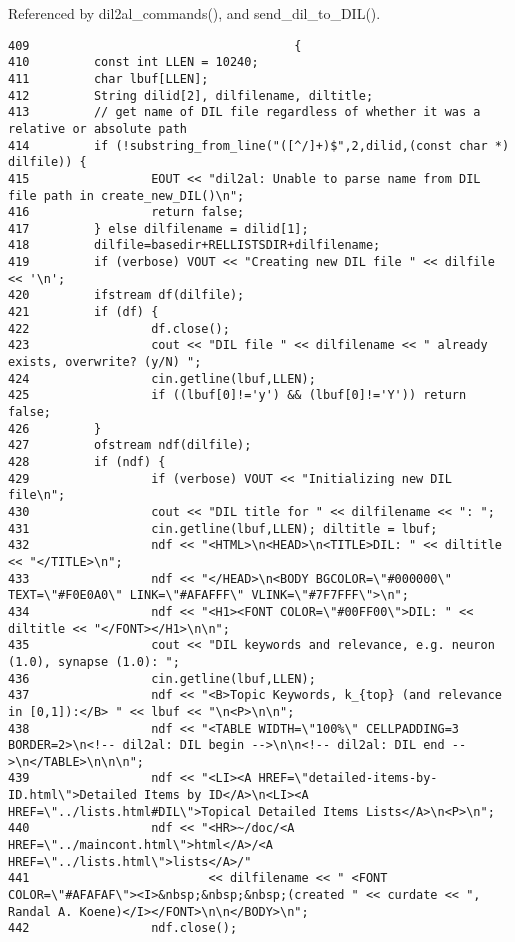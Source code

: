 Referenced by dil2al\_\-commands(), and send\_\-dil\_\-to\_\-DIL().



\footnotesize\begin{verbatim}409                                     {
410         const int LLEN = 10240;
411         char lbuf[LLEN];
412         String dilid[2], dilfilename, diltitle;
413         // get name of DIL file regardless of whether it was a relative or absolute path
414         if (!substring_from_line("([^/]+)$",2,dilid,(const char *) dilfile)) {
415                 EOUT << "dil2al: Unable to parse name from DIL file path in create_new_DIL()\n";
416                 return false;
417         } else dilfilename = dilid[1];
418         dilfile=basedir+RELLISTSDIR+dilfilename;
419         if (verbose) VOUT << "Creating new DIL file " << dilfile << '\n';
420         ifstream df(dilfile);
421         if (df) {
422                 df.close();
423                 cout << "DIL file " << dilfilename << " already exists, overwrite? (y/N) ";
424                 cin.getline(lbuf,LLEN);
425                 if ((lbuf[0]!='y') && (lbuf[0]!='Y')) return false;
426         }
427         ofstream ndf(dilfile);
428         if (ndf) {
429                 if (verbose) VOUT << "Initializing new DIL file\n";
430                 cout << "DIL title for " << dilfilename << ": ";
431                 cin.getline(lbuf,LLEN); diltitle = lbuf;
432                 ndf << "<HTML>\n<HEAD>\n<TITLE>DIL: " << diltitle << "</TITLE>\n";
433                 ndf << "</HEAD>\n<BODY BGCOLOR=\"#000000\" TEXT=\"#F0E0A0\" LINK=\"#AFAFFF\" VLINK=\"#7F7FFF\">\n";
434                 ndf << "<H1><FONT COLOR=\"#00FF00\">DIL: " << diltitle << "</FONT></H1>\n\n";
435                 cout << "DIL keywords and relevance, e.g. neuron (1.0), synapse (1.0): ";
436                 cin.getline(lbuf,LLEN);
437                 ndf << "<B>Topic Keywords, k_{top} (and relevance in [0,1]):</B> " << lbuf << "\n<P>\n\n";
438                 ndf << "<TABLE WIDTH=\"100%\" CELLPADDING=3 BORDER=2>\n<!-- dil2al: DIL begin -->\n\n<!-- dil2al: DIL end -->\n</TABLE>\n\n\n";
439                 ndf << "<LI><A HREF=\"detailed-items-by-ID.html\">Detailed Items by ID</A>\n<LI><A HREF=\"../lists.html#DIL\">Topical Detailed Items Lists</A>\n<P>\n";
440                 ndf << "<HR>~/doc/<A HREF=\"../maincont.html\">html</A>/<A HREF=\"../lists.html\">lists</A>/"
441                         << dilfilename << " <FONT COLOR=\"#AFAFAF\"><I>&nbsp;&nbsp;&nbsp;(created " << curdate << ", Randal A. Koene)</I></FONT>\n\n</BODY>\n";
442                 ndf.close();

\end{verbatim}
